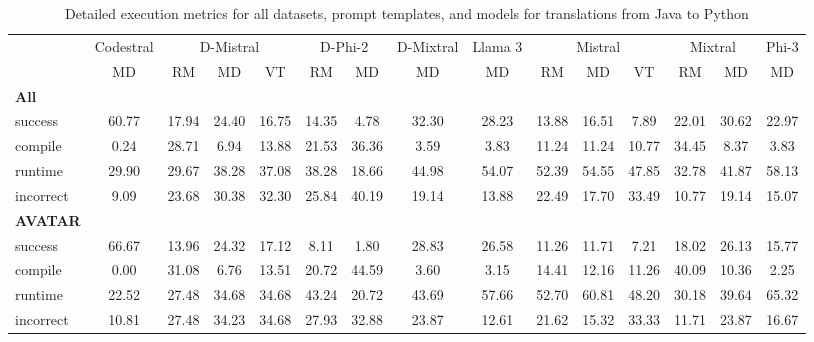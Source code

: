 \begin{table}[t]
\caption{Detailed execution metrics for all datasets, prompt templates, and models for translations from Java to Python}
\label{tab:iteration_1_stats_percent_Java_Python}

\setlength{\tabcolsep}{2.5pt} %
\renewcommand{\arraystretch}{1} %

\footnotesize
\begin{tabular}{@{}lcccccccccccccc@{}}
\toprule
 & Codestral & \multicolumn{3}{c}{D-Mistral} & \multicolumn{2}{c}{D-Phi-2} & D-Mixtral & Llama 3 & \multicolumn{3}{c}{Mistral}  & \multicolumn{2}{c}{Mixtral} & Phi-3 \\ 

\cmidrule(l){2-2}
\cmidrule(l){3-5}
\cmidrule(l){6-7}
\cmidrule(l){8-8}
\cmidrule(l){9-9}
\cmidrule(l){10-12}
\cmidrule(l){13-14}
\cmidrule(l){15-15}

& \multicolumn{1}{c}{MD}
& \multicolumn{1}{c}{RM}
& \multicolumn{1}{c}{MD}
& \multicolumn{1}{c}{VT}
& \multicolumn{1}{c}{RM}
& \multicolumn{1}{c}{MD} 
& \multicolumn{1}{c}{MD} 
& \multicolumn{1}{c}{MD} 
& \multicolumn{1}{c}{RM} 
& \multicolumn{1}{c}{MD} 
& \multicolumn{1}{c}{VT} 
& \multicolumn{1}{c}{RM}
& \multicolumn{1}{c}{MD} 
& \multicolumn{1}{c}{MD} \\

\midrule
\textbf{All} & & & & & & & & & & & & & & \\ 
\quad success & 60.77 & 17.94 & 24.40 & 16.75 & 14.35 & 4.78 & 32.30 & 28.23 & 13.88 & 16.51 & 7.89 & 22.01 & 30.62 & 22.97 \\
\qquad compile & 0.24 & 28.71 & 6.94 & 13.88 & 21.53 & 36.36 & 3.59 & 3.83 & 11.24 & 11.24 & 10.77 & 34.45 & 8.37 & 3.83 \\
\qquad runtime & 29.90 & 29.67 & 38.28 & 37.08 & 38.28 & 18.66 & 44.98 & 54.07 & 52.39 & 54.55 & 47.85 & 32.78 & 41.87 & 58.13 \\
\qquad incorrect & 9.09 & 23.68 & 30.38 & 32.30 & 25.84 & 40.19 & 19.14 & 13.88 & 22.49 & 17.70 & 33.49 & 10.77 & 19.14 & 15.07 \\
 

\textbf{AVATAR} & & & & & & & & & & & & & & \\
\quad success & 66.67 & 13.96 & 24.32 & 17.12 & 8.11 & 1.80 & 28.83 & 26.58 & 11.26 & 11.71 & 7.21 & 18.02 & 26.13 & 15.77 \\
\qquad compile & 0.00 & 31.08 & 6.76 & 13.51 & 20.72 & 44.59 & 3.60 & 3.15 & 14.41 & 12.16 & 11.26 & 40.09 & 10.36 & 2.25 \\
\qquad runtime & 22.52 & 27.48 & 34.68 & 34.68 & 43.24 & 20.72 & 43.69 & 57.66 & 52.70 & 60.81 & 48.20 & 30.18 & 39.64 & 65.32 \\
\qquad incorrect & 10.81 & 27.48 & 34.23 & 34.68 & 27.93 & 32.88 & 23.87 & 12.61 & 21.62 & 15.32 & 33.33 & 11.71 & 23.87 & 16.67 \\
 


\end{tabular}
\end{table}
